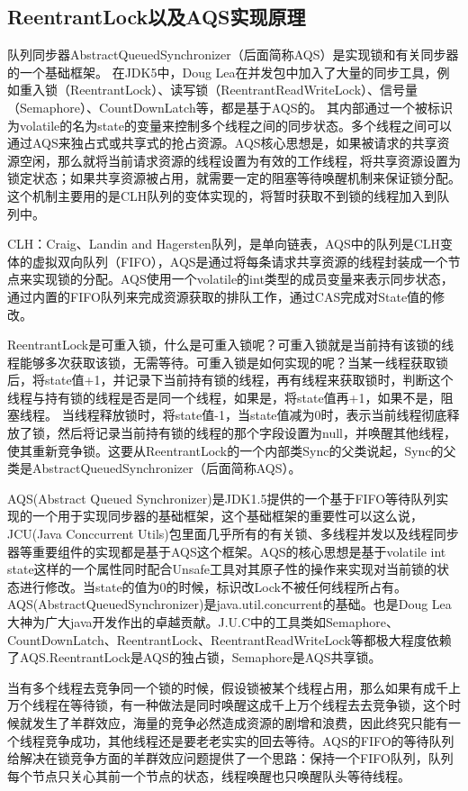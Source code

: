\documentclass[../../../interview-questions.tex]{subfiles}
\begin{document}
\subsection{ReentrantLock以及AQS实现原理}

队列同步器AbstractQueuedSynchronizer（后面简称AQS）是实现锁和有关同步器的一个基础框架。
在JDK5中，Doug Lea在并发包中加入了大量的同步工具，例如重入锁（ReentrantLock）、读写锁（ReentrantReadWriteLock）、信号量（Semaphore）、CountDownLatch等，都是基于AQS的。
其内部通过一个被标识为volatile的名为state的变量来控制多个线程之间的同步状态。多个线程之间可以通过AQS来独占式或共享式的抢占资源。AQS核心思想是，如果被请求的共享资源空闲，那么就将当前请求资源的线程设置为有效的工作线程，将共享资源设置为锁定状态；如果共享资源被占用，就需要一定的阻塞等待唤醒机制来保证锁分配。这个机制主要用的是CLH队列的变体实现的，将暂时获取不到锁的线程加入到队列中。

CLH：Craig、Landin and Hagersten队列，是单向链表，AQS中的队列是CLH变体的虚拟双向队列（FIFO），AQS是通过将每条请求共享资源的线程封装成一个节点来实现锁的分配。AQS使用一个volatile的int类型的成员变量来表示同步状态，通过内置的FIFO队列来完成资源获取的排队工作，通过CAS完成对State值的修改。

ReentrantLock是可重入锁，什么是可重入锁呢？可重入锁就是当前持有该锁的线程能够多次获取该锁，无需等待。可重入锁是如何实现的呢？当某一线程获取锁后，将state值+1，并记录下当前持有锁的线程，再有线程来获取锁时，判断这个线程与持有锁的线程是否是同一个线程，如果是，将state值再+1，如果不是，阻塞线程。
当线程释放锁时，将state值-1，当state值减为0时，表示当前线程彻底释放了锁，然后将记录当前持有锁的线程的那个字段设置为null，并唤醒其他线程，使其重新竞争锁。这要从ReentrantLock的一个内部类Sync的父类说起，Sync的父类是AbstractQueuedSynchronizer（后面简称AQS）。

AQS(Abstract Queued Synchronizer)是JDK1.5提供的一个基于FIFO等待队列实现的一个用于实现同步器的基础框架，这个基础框架的重要性可以这么说，JCU(Java Conccurrent Utils)包里面几乎所有的有关锁、多线程并发以及线程同步器等重要组件的实现都是基于AQS这个框架。AQS的核心思想是基于volatile int state这样的一个属性同时配合Unsafe工具对其原子性的操作来实现对当前锁的状态进行修改。当state的值为0的时候，标识改Lock不被任何线程所占有。AQS(AbstractQueuedSynchronizer)是java.util.concurrent的基础。也是Doug Lea大神为广大java开发作出的卓越贡献。J.U.C中的工具类如Semaphore、CountDownLatch、ReentrantLock、ReentrantReadWriteLock等都极大程度依赖了AQS.ReentrantLock是AQS的独占锁，Semaphore是AQS共享锁。

当有多个线程去竞争同一个锁的时候，假设锁被某个线程占用，那么如果有成千上万个线程在等待锁，有一种做法是同时唤醒这成千上万个线程去去竞争锁，这个时候就发生了羊群效应，海量的竞争必然造成资源的剧增和浪费，因此终究只能有一个线程竞争成功，其他线程还是要老老实实的回去等待。AQS的FIFO的等待队列给解决在锁竞争方面的羊群效应问题提供了一个思路：保持一个FIFO队列，队列每个节点只关心其前一个节点的状态，线程唤醒也只唤醒队头等待线程。
\end{document}
